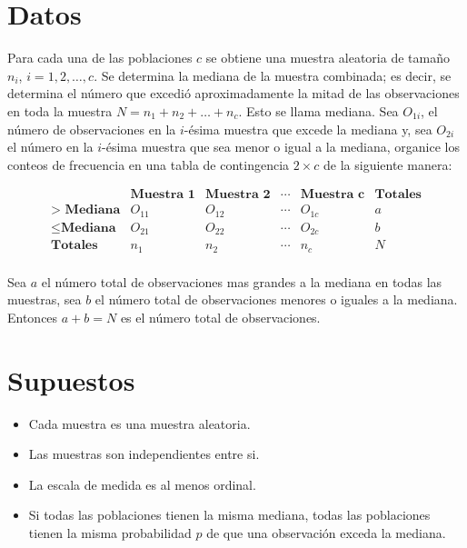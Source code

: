 \documentclass[
  a4paper,
  oneside,
  openany]{book}
\begin{document}
\hypertarget{datos-13}{%
\section{Datos}\label{datos-13}}

Para cada una de las poblaciones \(c\) se obtiene una muestra aleatoria de tamaño \(n_{i}\), \(i = 1,2,\ldots, c\). Se determina la mediana de la muestra combinada; es decir, se determina el número que excedió aproximadamente la mitad de las observaciones en toda la muestra \(N = n_{1} + n_{2}+ \ldots + n_{c}\). Esto se llama mediana. Sea \(O_{1i}\), el número de observaciones en la \(i\)-ésima muestra que excede la mediana y, sea \(O_{2i}\) el número en la \(i\)-ésima muestra que sea menor o igual a la mediana, organice los conteos de frecuencia en una tabla de contingencia \(2\times c\) de la siguiente manera:

\[
\begin{array}{c|c|c|c|c|c}
 & \textbf{Muestra 1}  & \textbf{Muestra 2}    & \cdots & \textbf{Muestra c} &\textbf{Totales}     \\
\hline
\textbf{> Mediana} & O_{11} & O_{12} & \cdots & O_{1c} & a   \\
\hline
\leq \textbf{Mediana} & O_{21} & O_{22} & \cdots & O_{2c} & b\\
\hline
\textbf{Totales}    & n_{1}  & n_{2}  & \cdots & n_{c}  & N \\
\end{array}
\]

Sea \(a\) el número total de observaciones mas grandes a la mediana en todas las muestras, sea \(b\) el número total de observaciones menores o iguales a la mediana. Entonces \(a+b=N\) es el número total de observaciones.

\hypertarget{supuestos-12}{%
\section{Supuestos}\label{supuestos-12}}

\begin{itemize}
\item
  Cada muestra es una muestra aleatoria.
\item
  Las muestras son independientes entre si.
\item
  La escala de medida es al menos ordinal.
\item
  Si todas las poblaciones tienen la misma mediana, todas las poblaciones tienen la misma probabilidad \(p\) de que una observación exceda la mediana.
\end{itemize}
\end{document}
